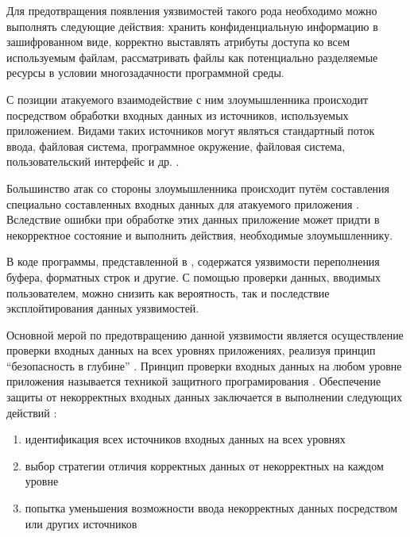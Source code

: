 %
Для предотвращения появления уязвимостей такого рода необходимо можно выполнять следующие действия: 
хранить конфиденциальную информацию в зашифрованном виде, корректно выставлять атрибуты доступа 
ко всем используемым файлам, рассматривать файлы как потенциально разделяемые ресурсы в условии 
многозадачности программной среды.



%
С позиции атакуемого  взаимодействие с ним злоумышленника происходит 
посредством обработки входных данных из источников, используемых приложением. 
%
Видами таких источников могут являться стандартный поток ввода, файловая система, программное 
окружение, файловая система, пользовательский интерфейс и др. . 

%
Большинство атак со стороны злоумышленника происходит путём составления специально составленных 
входных данных для атакуемого приложения . 
%
Вследствие ошибки при обработке этих данных приложение может придти в некорректное состояние и 
выполнить действия, необходимые злоумышленнику. 

%
В коде программы, представленной в 
, содержатся уязвимости 
переполнения буфера, форматных строк и другие. 
%
С помощью проверки данных, вводимых пользователем, можно снизить как вероятность, так и последствие 
эксплойтирования данных уязвимостей. 

%
Основной мерой по предотвращению данной уязвимости является осуществление проверки входных данных 
на всех уровнях приложениях, реализуя принцип “безопасность в глубине” . 
%
Принцип проверки входных данных на любом уровне приложения называется техникой защитного 
програмирования . 
%
Обеспечение защиты от некорректных входных данных заключается в выполнении следующих действий 
: 
\begin{enumerate}
	\item идентификация всех источников входных данных на всех уровнях 
	\item выбор стратегии отличия корректных данных от некорректных на каждом уровне 
	\item попытка уменьшения возможности ввода некорректных данных посредством  
		или других источников
\end{enumerate}

